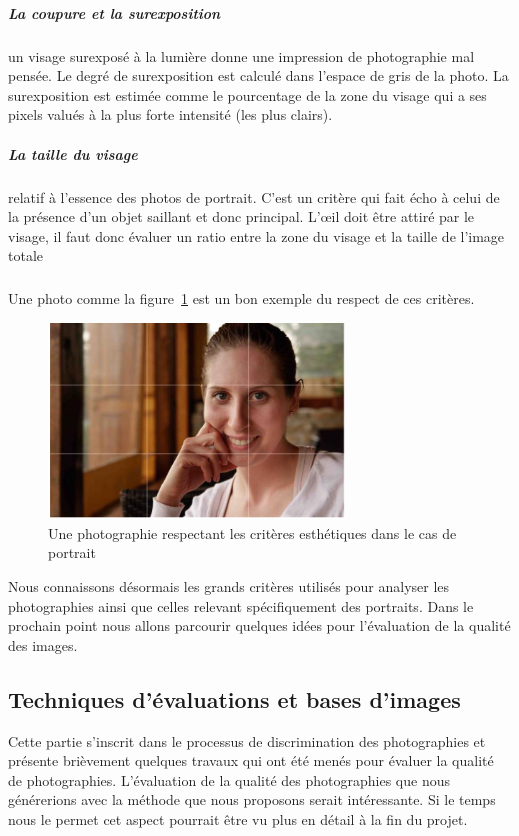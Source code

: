 \documentclass[11pt, french,screen]{report-rd-info}
\begin{document}
\subparagraph{La coupure et la surexposition} un visage surexposé à la lumière donne une impression de photographie mal pensée. Le degré de  surexposition est calculé dans l’espace de gris de la photo. La surexposition est estimée comme le pourcentage de la zone du visage qui a ses pixels valués à la plus forte intensité (les plus clairs).
\subparagraph{La taille du visage} relatif à l’essence des photos de portrait. C'est un critère qui fait écho à celui de la présence d'un objet saillant et donc principal. L’œil doit être attiré par le visage, il faut donc évaluer un ratio entre la zone du visage et la taille de l’image totale
\subparagraph*{}
Une photo comme la figure~\ref{fig:VisageAgreable} est un bon exemple du respect de ces critères.
\begin{figure}
	\centering
	\includegraphics[width=0.7\textwidth]{Images/ea_visageagreable}
	\caption{Une photographie respectant les critères esthétiques dans le cas de portrait\cite{Males2013}}
	\label{fig:VisageAgreable}
\end{figure}
Nous connaissons désormais les grands critères utilisés pour analyser les photographies ainsi que celles relevant spécifiquement des portraits. Dans le prochain point nous allons parcourir quelques idées pour l'évaluation de la qualité des images.
\subsection{Techniques d’évaluations et bases d’images}
Cette partie s’inscrit dans le processus de discrimination des photographies et présente brièvement quelques travaux qui ont été menés pour évaluer la qualité de photographies. L’évaluation de la qualité des photographies que nous générerions avec la méthode que nous proposons serait intéressante. Si le temps nous le permet cet aspect pourrait être vu plus en détail à la fin du projet.
\end{document}
